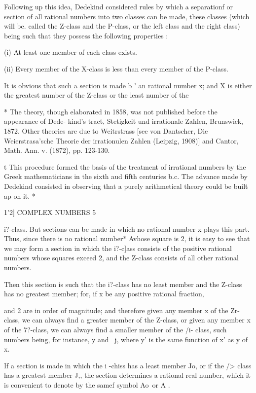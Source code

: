 Following up this idea, Dedekind considered rules by which a
separationf or section of all rational numbers into two classes can be
made, these classes (which will be. called the Z-class and the
P-class, or the left class and the right class) being such that they
possess the following properties :

(i) At least one member of each class exists.

(ii) Every member of the X-class is less than every member of the
P-class.

It is obvious that such a section is made b ' an rational number x;
and X is either the greatest number of the Z-class or the least number
of the

* The theory, though elaborated in 1858, was not published before the
appearance of Dede- kind's tract, Stetigkeit und irrationale Zahlen,
Brunswick, 1872. Other theories are due to Weitrstrass [see von
Dantscher, Die Weierstrasa'sche Theorie der irrationulen Zahlen
(Leipzig, 1908)] and Cantor, Math. Ann. v. (1872), pp. 123-130.

t This procedure formed the basis of the treatment of irrational
numbers by the Greek mathematicians in the sixth aud fifth centuries
b.c. The advance made by Dedekind consisted in observing that a purely
arithmetical theory could be built ap on it. *

1'2] COMPLEX NUMBERS 5

i?-class. But sections can be made in which no rational number x plays
this part. Thus, since there is no rational number* Avhose square is
2, it is easy to see that we may form a section in which the i?-c]ass
consists of the positive rational numbers whose squares exceed 2, and
the Z-class consists of all other rational numbers.

Then this section is such that the i?-class has no least member and
the Z-class has no greatest member; for, if x be any positive
rational fraction,

and 2 are in order of magnitude; and therefore given any member x of
the Zr-class, we can always find a greater member of the Z-class, or
given any member x of the 7?-class, we can always find a smaller
member of the /i- class, such numbers being, for instance, y and \ j,
where y' is the same function of x' as y of x.

If a section is made in which the i -chiss has a least member Jo, or
if the /> class has a greatest member J,, the section determines a
rational-real number, which it is convenient to denote by the samef
symbol Ao\ or A .

